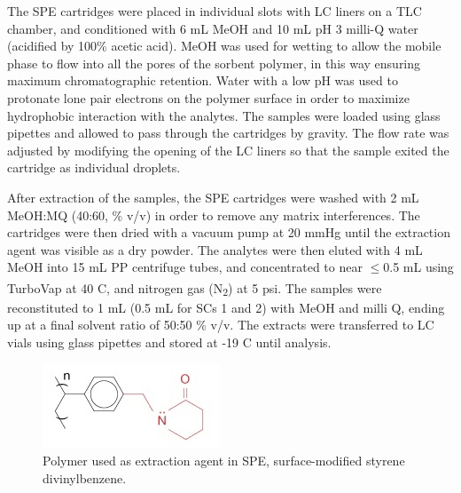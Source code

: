 The SPE cartridges were placed in individual slots with LC liners on a TLC chamber, and conditioned with 6 mL MeOH and 10 mL pH 3 milli-Q water (acidified by 100\% acetic acid). MeOH was used for wetting to allow the mobile phase to flow into all the pores of the sorbent polymer, in this way ensuring maximum chromatographic retention. Water with a low pH was used to protonate lone pair electrons on the polymer surface in order to maximize hydrophobic interaction with the analytes. The samples were loaded using glass pipettes and allowed to pass through the cartridges by gravity. The flow rate was adjusted by modifying the opening of the LC liners so that the sample exited the cartridge as individual droplets.

After extraction of the samples, the SPE cartridges were washed with 2 mL MeOH:MQ (40:60, \% v/v) in order to remove any matrix interferences. The cartridges were then dried with a vacuum pump at 20 mmHg until the extraction agent was visible as a dry powder. The analytes were then eluted with 4 mL MeOH into 15 mL PP centrifuge tubes, and concentrated to near $\le$0.5 mL using TurboVap\textsuperscript{\textregistered} at 40 \textdegree C, and nitrogen gas (N\textsubscript{2}) at 5 psi. The samples were reconstituted to 1 mL (0.5 mL for SCs 1 and 2) with MeOH and milli Q, ending up at a final solvent ratio of 50:50 \% v/v. The extracts were transferred to LC vials using glass pipettes and stored at -19 \textdegree C until analysis.

\begin{figure}
    \centering
    \includegraphics{Bilder/SPE_LCMS/mg_spe_strata-x.jpg}
    \caption{Polymer used as extraction agent in SPE, surface-modified styrene divinylbenzene.}
    \label{fig:StatPhase}
\end{figure}

